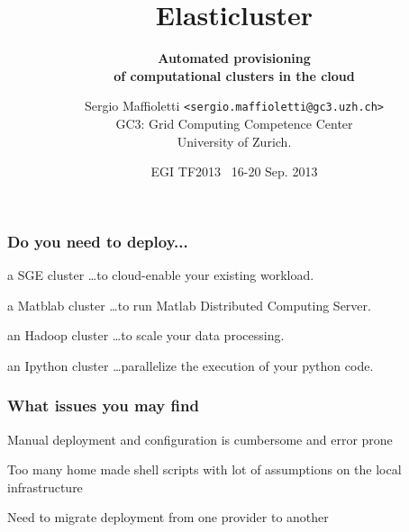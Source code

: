 \documentclass[english,serif,mathserif,usenames,dvipsnames]{beamer}
\begin{document}
\title[elasticluster]{Elasticluster}
\subtitle{\textbf{Automated provisioning \\ of computational clusters in the cloud}}

\author[S. Maffioletti]{Sergio Maffioletti \texttt{<sergio.maffioletti@gc3.uzh.ch>} \\
GC3: Grid Computing Competence Center \\
University of Zurich.}
\date{EGI TF2013 ~16-20 Sep. 2013}

\maketitle

\begin{frame}
  \frametitle{Do you need to deploy...}

  \begin{block}{a SGE cluster}
    \dots to cloud-enable your existing workload.
  \end{block}

  \begin{block}{a Matblab cluster}
    \dots to run Matlab Distributed Computing Server.
  \end{block}

  \begin{block}{an Hadoop cluster}
    \dots to scale your data processing.
  \end{block}

  \begin{block}{an Ipython cluster}
    \dots parallelize the execution of your python code.
  \end{block}

\end{frame}

\begin{frame}
  \frametitle{What issues you may find}
  \begin{block}{}
    Manual deployment and configuration is cumbersome and error prone
  \end{block}
  \begin{block}{}
    Too many home made shell scripts with lot of assumptions on the local infrastructure
  \end{block}
  \begin{block}{}
    Need to migrate deployment from one provider to another
  \end{block}
\end{frame}
\end{document}
